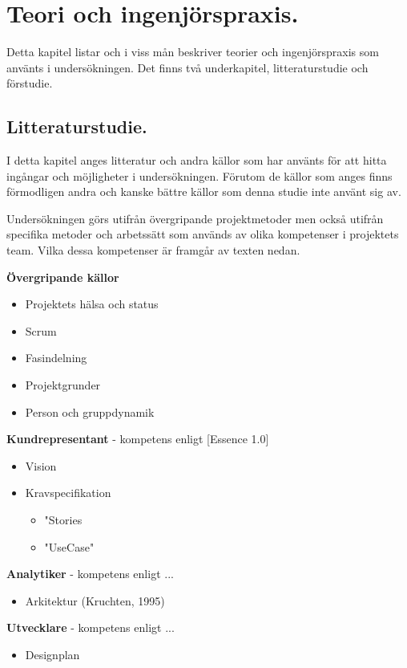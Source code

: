 \section{Teori och ingenjörspraxis.}
Detta kapitel listar och i viss mån beskriver teorier och ingenjörspraxis som använts
i undersökningen. Det finns två underkapitel, litteraturstudie och förstudie.

\subsection{Litteraturstudie.}
I detta kapitel anges litteratur och andra källor som har använts för att hitta ingångar
och möjligheter i undersökningen. Förutom de källor som anges finns förmodligen andra 
och kanske bättre källor som denna studie inte använt sig av.

Undersökningen görs utifrån övergripande projektmetoder men också utifrån specifika metoder
och arbetssätt som används av olika kompetenser i projektets team. Vilka dessa kompetenser
är framgår av texten nedan.

\textbf{Övergripande källor}
\begin{itemize}
    \item Projektets hälsa och status
    \item Scrum
    \item Fasindelning
    \item Projektgrunder
    \item Person och gruppdynamik
\end{itemize}

\textbf{Kundrepresentant} - kompetens enligt [Essence 1.0]
\begin{itemize}
    \item Vision
    \item Kravspecifikation
    \begin{itemize}
        \item "Stories
        \item "UseCase"
    \end{itemize}
\end{itemize}

\textbf{Analytiker} - kompetens enligt ...
\begin{itemize}
    \item Arkitektur (Kruchten, 1995)
\end{itemize}

\textbf{Utvecklare} - kompetens enligt ...
\begin{itemize}
    \item Designplan
\end{itemize}

